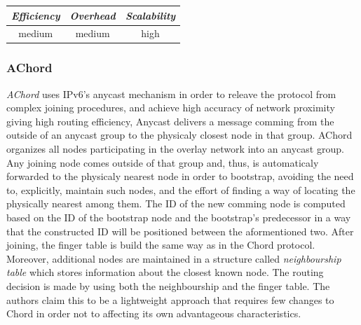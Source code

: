 

\begin{center}
\begin{tabular}{ccc}
\emph{Efficiency} & \emph{Overhead} & \emph{Scalability} \\
\hline
medium &
medium &
high
\end{tabular}
\end{center}

\subsubsection{AChord}
\emph{AChord} \cite{DK2006} uses IPv6's anycast mechanism in order to
releave the protocol from complex joining procedures, and achieve high accuracy
of network proximity giving high routing efficiency, Anycast delivers a message
comming from the outside of an anycast group to the physicaly closest node in
that group. AChord organizes all nodes participating in the overlay network into
an anycast group. Any joining node comes outside of that group and, thus, is
automaticaly forwarded to the physicaly nearest node in order to bootstrap,
avoiding the need to, explicitly, maintain such nodes, and the effort of finding
a way of locating the physically nearest among them. The ID of the new comming
node is computed based on the ID of the bootstrap node and the bootstrap's
predecessor in a way that the constructed ID will be positioned between the
aformentioned two. After joining, the finger table is build the same way as in
the Chord protocol. Moreover, additional nodes are maintained in a structure
called \emph{neighbourship table} which stores information about the closest
known node. The routing decision is made by using both the neighbourship and
the finger table. The authors claim this to be a lightweight approach that
requires few changes to Chord in order not to affecting its own advantageous
characteristics.

